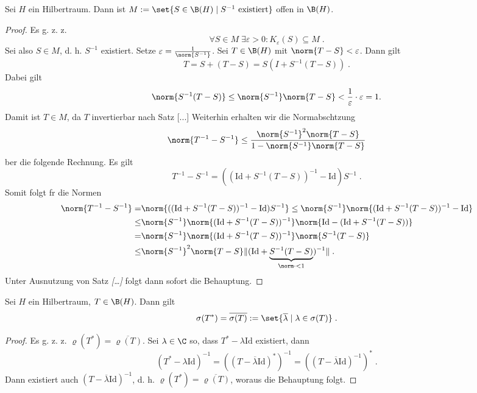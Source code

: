 \begin{theorem}
	Sei $H$ ein Hilbertraum. Dann ist \( M:= \set{S \in \B(H) \;\vert\; S^{-1} \text{ existiert}}\) offen in \(\B(H)\). \label{invertible_bounded_operators_open}
\end{theorem}
\begin{proof}
	Es g. z. z. 
	\[\forall S \in M \;\exists \varepsilon > 0: K_\varepsilon(S) \subseteq M\;.\]
	Sei also $S\in M$, d. h. \(S^{-1}\) existiert. Setze \(\varepsilon = \frac{1}{\norm{S^{-1}}}\). Sei \(T\in \B(H)\) mit \(\norm{T-S} < \varepsilon\).
	Dann gilt
	\[T = S + (T-S) = S (I + S^{-1}(T-S))\;.\]
	Dabei gilt 
	\[\norm{S^{-1}(T-S)} \leq \norm{S^{-1}}\norm{T-S} < \frac 1\varepsilon\cdot \varepsilon =1.\]
	Damit ist \(T\in M\), da $T$ invertierbar nach Satz [...] 
	Weiterhin erhalten wir die Normabsch\as tzung
	\[\norm{T^{-1} - S^{-1}} \leq \frac{\norm{S^{-1}}^2\norm{T-S}}{1-\norm{S^{-1}}\norm{T-S}}\]
	\us ber die folgende Rechnung. Es gilt 
	\[T^{-1} - S^{-1} = ((\text{Id} +S^{-1}(T-S))^{-1}-\text{Id})S^{-1}\;.\]
	Somit folgt f\us r die Normen
	\begin{align*}
	 	\norm{T^{-1} - S^{-1}} = &\norm{((\text{Id} +S^{-1}(T-S))^{-1}-\text{Id})S^{-1}} \leq \norm{S^{-1}} \norm{(\text{Id} +S^{-1}(T-S))^{-1}-\text{Id}} \\
	 	\leq &\norm{S^{-1}} \norm{(\text{Id} +S^{-1}(T-S))^{-1}} \norm{\text{Id} - (\text{Id} +S^{-1}(T-S))}\\
	 	= & \norm{S^{-1}} \norm{(\text{Id} +S^{-1}(T-S))^{-1}} \norm{S^{-1}(T-S)}\\
	 	\leq &  \norm{S^{-1}}^2 \norm{T-S} \lVert (\text{Id} +\underbrace{S^{-1}(T-S)}_{\norm\cdot < 1})^{-1}\rVert \;.
	\end{align*}
		Unter Ausnutzung von Satz \textit{[\ldots]} folgt dann sofort die Behauptung.
	\end{proof}
	
	\begin{theorem}
		Sei $H$ ein Hilbertraum, \(T \in \B(H)\). Dann gilt 
		\[\sigma(T^*) = \overline{\sigma(T)} := \set{\overline{\lambda}\;\vert\; \lambda \in \sigma(T)}\;.\]
	\end{theorem}
	\begin{proof}
		Es g. z. z. \(\varrho(T^*) = \overline{\varrho(T)}\). Sei \(\lambda \in \C\) so, dass \(T^*-\lambda\text{Id}\) existiert, dann
		\[(T^* - \lambda \text{Id})^{-1} = ((T-\overline{\lambda}\text{Id})^*)^{-1} = \left((T-\overline{\lambda}\text{Id})^{-1}\right)^*\;. \]
		Dann existiert auch \((T-\overline{\lambda}\text{Id})^{-1}\), d. h. \(\varrho(T^*) = \overline{\varrho(T)}\), woraus die Behauptung folgt.
	\end{proof}
	
